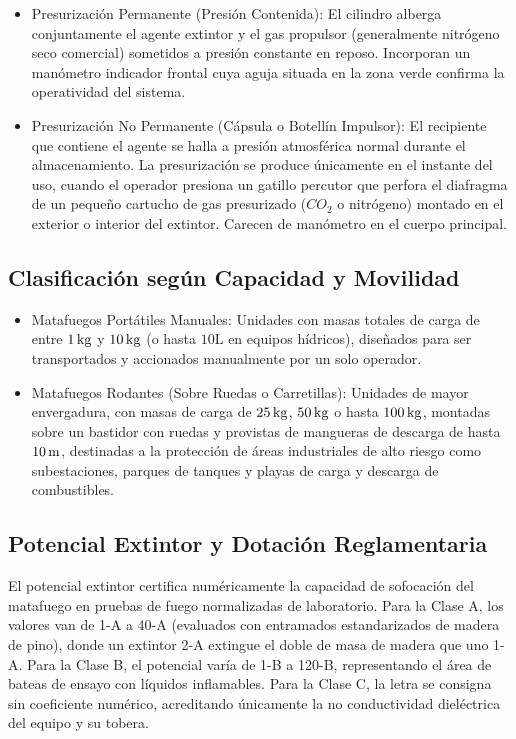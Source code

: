 \begin{itemize}
    \item Presurización Permanente (Presión Contenida): El cilindro alberga conjuntamente el agente extintor y el gas
          propulsor (generalmente nitrógeno seco comercial) sometidos a presión constante en reposo. Incorporan un
          manómetro indicador frontal cuya aguja situada en la zona verde confirma la operatividad del sistema.
    \item Presurización No Permanente (Cápsula o Botellín Impulsor): El recipiente que contiene el agente se halla a presión
          atmosférica normal durante el almacenamiento. La presurización se produce únicamente en el instante del uso,
          cuando el operador presiona un gatillo percutor que perfora el diafragma de un pequeño cartucho de gas presurizado
          ($CO_2$ o nitrógeno) montado en el exterior o interior del extintor. Carecen de manómetro en el cuerpo principal.
\end{itemize}

\subsection{Clasificación según Capacidad y Movilidad}

\begin{itemize}
    \item Matafuegos Portátiles Manuales: Unidades con masas totales de carga de entre $1\,\mathrm{kg}$ y $10\,\mathrm{kg}$ (o hasta
          $10\unit{\liter}$ en equipos hídricos), diseñados para ser transportados y accionados manualmente por un solo
          operador.
    \item Matafuegos Rodantes (Sobre Ruedas o Carretillas): Unidades de mayor envergadura, con masas de carga de $25\,\mathrm{kg}$,
          $50\,\mathrm{kg}$ o hasta $100\,\mathrm{kg}$, montadas sobre un bastidor con ruedas y provistas de mangueras de descarga de hasta
          $10\,\mathrm{m}$, destinadas a la protección de áreas industriales de alto riesgo como subestaciones, parques de tanques y
          playas de carga y descarga de combustibles.
\end{itemize}

\subsection{Potencial Extintor y Dotación Reglamentaria}

El potencial extintor certifica numéricamente la capacidad de sofocación del matafuego en pruebas de
fuego normalizadas de laboratorio. Para la Clase A, los valores van de 1-A a 40-A (evaluados con entramados estandarizados
de madera de pino), donde un extintor 2-A extingue el doble de masa de madera que uno 1-A. Para la Clase B, el potencial
varía de 1-B a 120-B, representando el área de bateas de ensayo con líquidos inflamables. Para la Clase C, la letra se
consigna sin coeficiente numérico, acreditando únicamente la no conductividad dieléctrica del equipo y su tobera.

